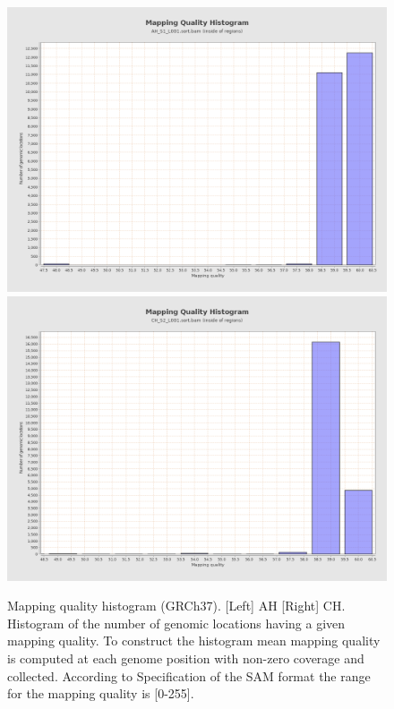 \documentclass{article}
\begin{document}
\begin{figure}[ht] \hspace*{0cm} 
\begin{center}
    \includegraphics[scale=0.12]{qualimap/AH_S1_L001.sort_stats/images_qualimapReport/genome_mapping_quality_histogram}
        \includegraphics[scale=0.12]{qualimap/CH_S2_L001.sort_stats/images_qualimapReport/genome_mapping_quality_histogram}
	\caption{
	Mapping quality histogram (GRCh37). [Left] AH [Right] CH.
Histogram of the number of genomic locations having a given mapping quality. To construct the histogram mean mapping quality is computed at each genome position with non-zero coverage and collected. According to Specification of the SAM format the range for the mapping quality is [0-255].
	}
	\label{fig:qualimap_map_qual_hist}
\end{center}
\end{figure}
\end{document}
